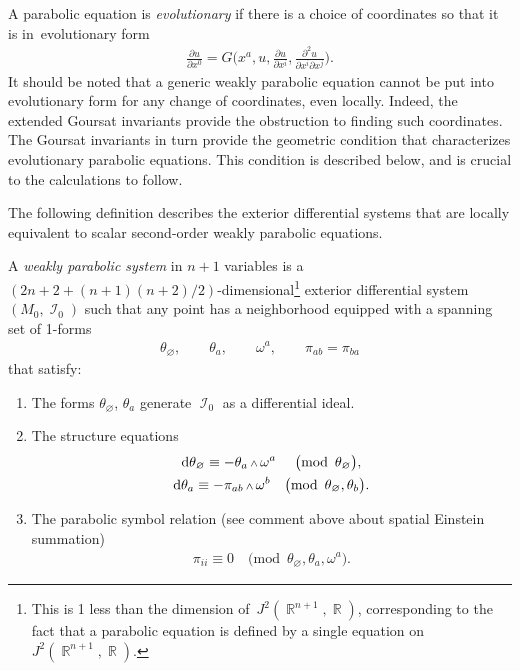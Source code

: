 \documentclass[10pt,a4paper]{amsart}
\DeclareMathOperator{\R}{\mathbb{R}}
\DeclareMathOperator{\I}{\mathcal{I}}
\renewcommand{\d}{{\rm d}}
\renewcommand{\mod}[1]{\quad\big(\mathrm{mod\enspace} #1\big)}
\newcommand{\pDeriv}[2]{\frac{\partial #1}{\partial #2}}
\newcommand{\w}{{\mathchoice{\,{\scriptstyle\wedge}\,}{{\scriptstyle\wedge}}
 {{\scriptscriptstyle\wedge}}{{\scriptscriptstyle\wedge}}}}
\newcommand{\thetas}[1]{\theta_{#1}}
\newcommand{\pis}[1]{\pi_{#1}}
\numberwithin{equation}{section}
\begin{document}
A parabolic equation is \emph{evolutionary} if there is a choice of coordinates so that it is in~evolutionary form
\begin{gather*}
 \pDeriv{u}{x^0} = G\bigg(x^a,u,\pDeriv{u}{x^i},\pDeriv{^2 u}{x^i\partial x^j}\bigg) .
\end{gather*}
It should be noted that a generic weakly parabolic equation cannot be put into evolutionary form for any change of coordinates, even locally. Indeed, the extended Goursat invariants provide the obstruction to finding such coordinates. The Goursat invariants in turn provide the geometric condition that characterizes evolutionary parabolic equations. This condition is described below, and is crucial to the calculations to follow.

The following definition describes the exterior differential systems that are locally equivalent to scalar second-order weakly parabolic equations.
\begin{Definition}\label{def:weakly parabolic system}
 A \emph{weakly parabolic system} in $n+1$ variables is a
 $(2n+2+(n+1)(n+2)/2)$-dimensional\footnote{This is 1 less than the dimension of~$J^2(\R^{n+1},\R)$, corresponding to the fact that a parabolic equation is defined by a single equation on $J^2(\R^{n+1},\R)$.} exterior differential system $(M_0,\I_0)$ such that any point has a neighborhood equipped with a spanning set of 1-forms
 \begin{gather*}%
 \thetas{\varnothing},\qquad \thetas{a},\qquad\omega^a,\qquad\pis{ab} = \pis{ba}
 \end{gather*}
 that satisfy:
 \begin{enumerate}\itemsep=0pt
 \item
 The forms $\thetas{\varnothing}$, $\thetas{a}$ generate $\I_0$ as a differential ideal.
 \item
 The structure equations
 \begin{gather*}
 \d\thetas{\varnothing} \equiv -\thetas{a}\w\omega^a \ \mod{\thetas{\varnothing}},
 \\
 \d\thetas{a} \equiv -\pis{ab}\w\omega^b \mod{\thetas{\varnothing},\thetas{b}} .
 \end{gather*}
 \item
 The parabolic symbol relation (see comment above about spatial Einstein summation)
 \begin{gather*}
 \pis{ii} \equiv 0 \mod{\thetas{\varnothing},\thetas{a},\omega^a} .
 \end{gather*}
 \end{enumerate}
\end{Definition}
\end{document}
